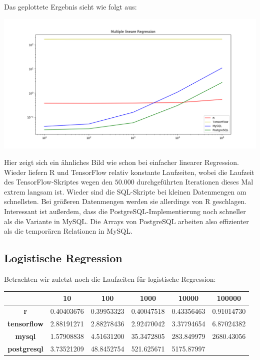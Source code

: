 Das geplottete Ergebnis sieht wie folgt aus:

\includegraphics[width=\textwidth]{multipleLinearRegressionBenchmark}

Hier zeigt sich ein ähnliches Bild wie schon bei einfacher linearer Regression. Wieder liefern R und TensorFlow relativ konstante Laufzeiten, wobei die Laufzeit des TensorFlow-Skriptes wegen den $50.000$ durchgeführten Iterationen dieses Mal extrem langsam ist. Wieder sind die SQL-Skripte bei kleinen Datenmengen am schnellsten. Bei größeren Datenmengen werden sie allerdings von R geschlagen. Interessant ist außerdem, dass die PostgreSQL-Implementierung noch schneller als die Variante in MySQL. Die Arrays von PostgreSQL arbeiten also effizienter als die temporären Relationen in MySQL.

\subsection{Logistische Regression}
\label{subsection:4:1:3}

Betrachten wir zuletzt noch die Laufzeiten für logistische Regression:

\begin{center}
  \begin{tabular}{|c|c|c|c|c|c|}\hline
    & \textbf{10} & \textbf{100} & \textbf{1000} & \textbf{10000} & \textbf{100000} \\ \hline
    \textbf{r} & 0.40403676 & 0.39953323 & 0.40047518 & 0.43356463 & 0.91014730 \\ \hline
    \textbf{tensorflow} & 2.88191271 & 2.88278436 & 2.92470042 & 3.37794654 & 6.87024382 \\ \hline
    \textbf{mysql} & 1.57908838 & 4.51631200 & 35.3472805 & 283.849979 & 2680.43056 \\ \hline
    \textbf{postgresql} & 3.73521209 & 48.8452754 & 521.625671 & 5175.87997 &  \\ \hline
  \end{tabular}
\end{center}

